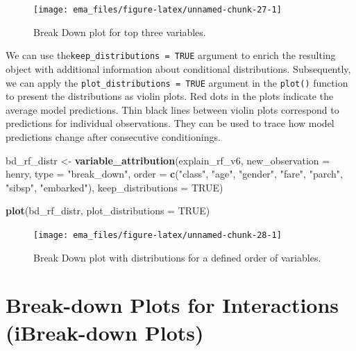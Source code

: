 \documentclass[]{krantz}
\newenvironment{Shaded}{\begin{snugshade}}{\end{snugshade}}
\newcommand{\DataTypeTok}[1]{\textcolor[rgb]{0.13,0.29,0.53}{#1}}
\newcommand{\KeywordTok}[1]{\textcolor[rgb]{0.13,0.29,0.53}{\textbf{#1}}}
\newcommand{\NormalTok}[1]{#1}
\newcommand{\OtherTok}[1]{\textcolor[rgb]{0.56,0.35,0.01}{#1}}
\newcommand{\StringTok}[1]{\textcolor[rgb]{0.31,0.60,0.02}{#1}}
\begin{document}
\begin{figure}

{\centering \texttt{[image: ema\_files/figure-latex/unnamed-chunk-27-1]} 

}

\caption{Break Down plot for top three variables.}\label{fig:unnamed-chunk-27}
\end{figure}

We can use the\texttt{keep\_distributions\ =\ TRUE} argument to enrich the resulting object with additional information about conditional distributions. Subsequently, we can apply the \texttt{plot\_distributions\ =\ TRUE} argument in the \texttt{plot()} function to present the distributions as violin plots. Red dots in the plots indicate the average model predictions. Thin black lines between violin plots correspond to predictions for individual observations. They can be used to trace how model predictions change after consecutive conditionings.

\begin{Shaded}
\begin{Highlighting}[]
\NormalTok{bd_rf_distr <-}\StringTok{ }\KeywordTok{variable_attribution}\NormalTok{(explain_rf_v6,}
          \DataTypeTok{new_observation =}\NormalTok{ henry, }\DataTypeTok{type =} \StringTok{"break_down"}\NormalTok{,}
          \DataTypeTok{order =} \KeywordTok{c}\NormalTok{(}\StringTok{"class"}\NormalTok{, }\StringTok{"age"}\NormalTok{, }\StringTok{"gender"}\NormalTok{, }\StringTok{"fare"}\NormalTok{, }
                           \StringTok{"parch"}\NormalTok{, }\StringTok{"sibsp"}\NormalTok{, }\StringTok{"embarked"}\NormalTok{),}
          \DataTypeTok{keep_distributions =} \OtherTok{TRUE}\NormalTok{)}

\KeywordTok{plot}\NormalTok{(bd_rf_distr, }\DataTypeTok{plot_distributions =} \OtherTok{TRUE}\NormalTok{) }
\end{Highlighting}
\end{Shaded}

\begin{figure}

{\centering \texttt{[image: ema\_files/figure-latex/unnamed-chunk-28-1]} 

}

\caption{Break Down plot with distributions for a defined order of variables.}\label{fig:unnamed-chunk-28}
\end{figure}

\hypertarget{iBreakDown}{%
\chapter{Break-down Plots for Interactions (iBreak-down Plots)}\label{iBreakDown}}
\end{document}
